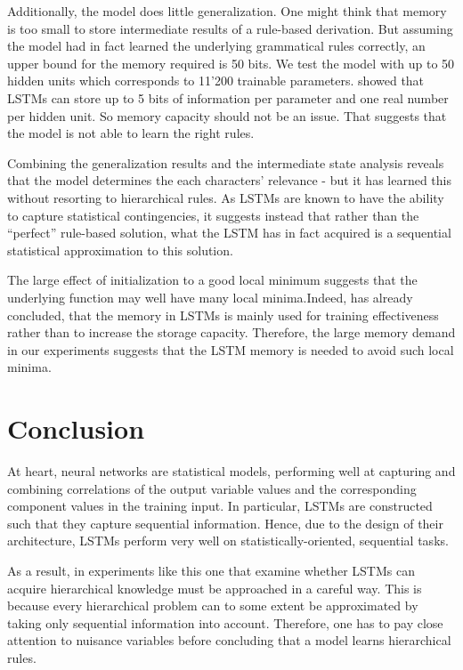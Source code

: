 \documentclass[11pt,a4paper]{article}
\begin{document}
Additionally, the model does little generalization. One might think that memory is too small to store intermediate results of a rule-based derivation. But assuming the model had in fact learned the underlying grammatical rules correctly, an upper bound for the memory required is 50 bits. We test the model with up to 50 hidden units which corresponds to 11'200 trainable parameters. \citeauthor{collins2016capacity} 
 showed that LSTMs can store up to 5 bits of information per parameter and one real number per hidden unit. So memory capacity should not be an issue. That suggests that the model is not able to learn the right rules.

Combining the generalization results and the intermediate state analysis reveals that the model determines the each characters' relevance - but it has learned this without resorting to hierarchical rules. As LSTMs are known to have the ability to capture statistical contingencies, it suggests instead that rather than the ``perfect'' rule-based solution, what the LSTM has in fact acquired is a sequential statistical approximation to this solution.

The large effect of initialization to a good local minimum suggests that the underlying function may well have many local minima.Indeed, \citeauthor{collins2016capacity}  has already concluded, that the memory in LSTMs is mainly used for training effectiveness rather than to increase the storage capacity. Therefore, the large memory demand in our experiments suggests that the LSTM memory is needed to avoid such local minima.

\section{Conclusion}

At heart, neural networks are statistical models, performing well at capturing and combining correlations of the output variable values and the corresponding component values in the training input. In particular, LSTMs are constructed such that they capture sequential information. Hence, due to the design of their architecture, LSTMs perform very well on statistically-oriented, sequential tasks. 

As a result, in experiments like this one that examine whether LSTMs can acquire hierarchical knowledge must be approached in a careful way.  This is because every hierarchical problem can to some extent be approximated by taking only sequential information into account. 
Therefore, one has to pay close attention to nuisance variables before concluding that a model learns hierarchical rules.
\end{document}
